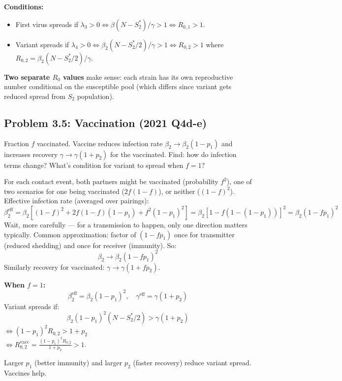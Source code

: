 \documentclass[10pt]{article}
\begin{document}
\begin{solution}
\textbf{Conditions:}
\begin{itemize}
\item First virus spreads if $\lambda_3 > 0 \iff \beta(N-S_2^*)/\gamma > 1 \iff R_{0,1} > 1$.
\item Variant spreads if $\lambda_4 > 0 \iff \beta_2(N-S_2^*/2)/\gamma > 1 \iff R_{0,2} > 1$ where $R_{0,2} = \beta_2(N - S_2^*/2)/\gamma$.
\end{itemize}

\textbf{Two separate $R_0$ values} make sense: each strain has its own reproductive number conditional on the susceptible pool (which differs since variant gets reduced spread from $S_2$ population).
\end{solution}

\subsection{Problem 3.5: Vaccination (2021 Q4d-e)}

\begin{problem}
Fraction $f$ vaccinated. Vaccine reduces infection rate $\beta_2 \to \beta_2(1-p_1)$ and increases recovery $\gamma \to \gamma(1+p_2)$ for the vaccinated. Find: how do infection terms change? What's condition for variant to spread when $f = 1$?
\end{problem}

\begin{solution}
For each contact event, both partners might be vaccinated (probability $f^2$), one of two scenarios for one being vaccinated ($2f(1-f)$), or neither ($(1-f)^2$). Effective infection rate (averaged over pairings):
\[
\beta_2^{\text{eff}} = \beta_2[(1-f)^2 + 2f(1-f)(1-p_1) + f^2(1-p_1)^2] = \beta_2[1 - f(1-(1-p_1))]^2 = \beta_2(1-fp_1)^2
\]
Wait, more carefully — for a transmission to happen, only one direction matters typically. Common approximation: factor of $(1-fp_1)$ once for transmitter (reduced shedding) and once for receiver (immunity). So:
\[
\beta_2 \to \beta_2(1-fp_1)^2
\]
Similarly recovery for vaccinated: $\gamma \to \gamma(1 + fp_2)$.

\textbf{When $f = 1$:}
\[
\beta_2^{\text{eff}} = \beta_2(1-p_1)^2, \quad \gamma^{\text{eff}} = \gamma(1+p_2)
\]
Variant spreads if:
\[
\beta_2(1-p_1)^2(N-S_2^*/2) > \gamma(1+p_2)
\]
$\iff (1-p_1)^2 R_{0,2} > 1 + p_2$\\
$\iff R_{0,2}^{\text{vacc}} = \frac{(1-p_1)^2 R_{0,2}}{1+p_2} > 1$.

Larger $p_1$ (better immunity) and larger $p_2$ (faster recovery) reduce variant spread. Vaccines help.
\end{solution}
\end{document}
